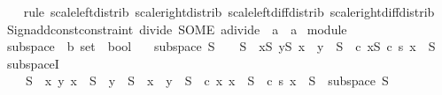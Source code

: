 \begin{isabellebody}
%
\isadelimproof
\ \ %
\endisadelimproof
%
\isatagproof
{}\isamarkupfalse%
\ {\isacharparenleft}{\kern0pt}rule\ scale{\isacharunderscore}{\kern0pt}left{\isacharunderscore}{\kern0pt}distrib\ scale{\isacharunderscore}{\kern0pt}right{\isacharunderscore}{\kern0pt}distrib\ scale{\isacharunderscore}{\kern0pt}left{\isacharunderscore}{\kern0pt}diff{\isacharunderscore}{\kern0pt}distrib\ scale{\isacharunderscore}{\kern0pt}right{\isacharunderscore}{\kern0pt}diff{\isacharunderscore}{\kern0pt}distrib{\isacharparenright}{\kern0pt}{\isacharplus}{\kern0pt}%
\endisatagproof
{\isafoldproof}%
%
\isadelimproof
\isanewline
%
\endisadelimproof
\isanewline
{}\isamarkupfalse%
\isanewline
%
\isadelimML
\isanewline
%
\endisadelimML
%
\isatagML
{}\isamarkupfalse%
\ {\isacartoucheopen}Sign{\isachardot}{\kern0pt}add{\isacharunderscore}{\kern0pt}const{\isacharunderscore}{\kern0pt}constraint\ {\isacharparenleft}{\kern0pt}\isactrlconstUNDERSCOREname {\isasymopen}divide{\isasymclose}{\isacharcomma}{\kern0pt}\ SOME\ \isactrltyp {\isasymopen}{\isacharprime}{\kern0pt}a{\isacharcolon}{\kern0pt}{\isacharcolon}{\kern0pt}divide\ {\isasymRightarrow}\ {\isacharprime}{\kern0pt}a\ {\isasymRightarrow}\ {\isacharprime}{\kern0pt}a{\isasymclose}{\isacharparenright}{\kern0pt}{\isacartoucheclose}%
\endisatagML
{\isafoldML}%
%
\isadelimML
%
\endisadelimML
%
\isadelimdocument
%
\endisadelimdocument
%
\isatagdocument
%
\isamarkuptrue%
%
\endisatagdocument
{\isafolddocument}%
%
\isadelimdocument
%
\endisadelimdocument
{}\isamarkupfalse%
\ module\isanewline
{}\isanewline
\isanewline
{}\isamarkupfalse%
\ subspace\ {\isacharcolon}{\kern0pt}{\isacharcolon}{\kern0pt}\ {\isachardoublequoteopen}{\isacharprime}{\kern0pt}b\ set\ {\isasymRightarrow}\ bool{\isachardoublequoteclose}\isanewline
\ \ \ {\isachardoublequoteopen}subspace\ S\ {\isasymlongleftrightarrow}\ {}\ {\isasymin}\ S\ {\isasymand}\ {\isacharparenleft}{\kern0pt}{\isasymforall}x{\isasymin}S{\isachardot}{\kern0pt}\ {\isasymforall}y{\isasymin}S{\isachardot}{\kern0pt}\ x\ {\isacharplus}{\kern0pt}\ y\ {\isasymin}\ S{\isacharparenright}{\kern0pt}\ {\isasymand}\ {\isacharparenleft}{\kern0pt}{\isasymforall}c{\isachardot}{\kern0pt}\ {\isasymforall}x{\isasymin}S{\isachardot}{\kern0pt}\ c\ {\isacharasterisk}{\kern0pt}s\ x\ {\isasymin}\ S{\isacharparenright}{\kern0pt}{\isachardoublequoteclose}\isanewline
\isanewline
{}\isamarkupfalse%
\ subspaceI{\isacharcolon}{\kern0pt}\isanewline
\ \ {\isachardoublequoteopen}{}\ {\isasymin}\ S\ {\isasymLongrightarrow}\ {\isacharparenleft}{\kern0pt}{\isasymAnd}x\ y{\isachardot}{\kern0pt}\ x\ {\isasymin}\ S\ {\isasymLongrightarrow}\ y\ {\isasymin}\ S\ {\isasymLongrightarrow}\ x\ {\isacharplus}{\kern0pt}\ y\ {\isasymin}\ S{\isacharparenright}{\kern0pt}\ {\isasymLongrightarrow}\ {\isacharparenleft}{\kern0pt}{\isasymAnd}c\ x{\isachardot}{\kern0pt}\ x\ {\isasymin}\ S\ {\isasymLongrightarrow}\ c\ {\isacharasterisk}{\kern0pt}s\ x\ {\isasymin}\ S{\isacharparenright}{\kern0pt}\ {\isasymLongrightarrow}\ subspace\ S{\isachardoublequoteclose}\isanewline

\end{isabellebody}
